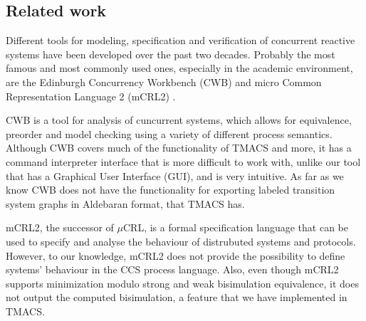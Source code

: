 \subsection{Related work} 
Different tools for modeling, specification and verification of concurrent reactive systems have been developed over the past two decades. Probably the most famous and most commonly used ones, especially in the academic environment, are the Edinburgh Concurrency Workbench (CWB) \cite{CWB} and micro Common Representation Language 2 (mCRL2) \cite{mCRL2}\cite{ProcessAlgebraParallel}. 

CWB is a tool for analysis of cuncurrent systems, which allows for equivalence, preorder and model checking using a variety of different process semantics. %
Although CWB covers much of the functionality of TMACS and more, it has a command interpreter interface that is more difficult to work with, unlike our tool that has a Graphical User Interface (GUI), and is very intuitive. As far as we know CWB does not have the functionality for exporting labeled transition system graphs in Aldebaran format, that TMACS has. 

mCRL2, the successor of $\mu$CRL, is a formal specification language that can be used to specify and analyse the behaviour of distrubuted systems and protocols. %
However, to our knowledge, mCRL2 does not provide the possibility to define systems' behaviour in the CCS process language.
Also, even though mCRL2 supports minimization modulo strong and weak bisimulation equivalence, it does not output the computed bisimulation, a feature that we have implemented in TMACS.  

